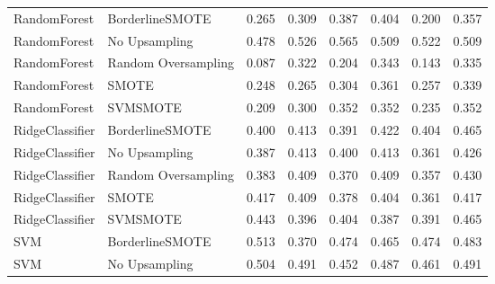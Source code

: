 \begin{tabular}{llllllll}
                RandomForest &     BorderlineSMOTE & 0.265 &                     0.309 &                 0.387 &                  0.404 &                                   0.200 &    0.357 \\
                RandomForest &       No Upsampling & 0.478 &                     0.526 &                 0.565 &                  0.509 &                                   0.522 &    0.509 \\
                RandomForest & Random Oversampling & 0.087 &                     0.322 &                 0.204 &                  0.343 &                                   0.143 &    0.335 \\
                RandomForest &               SMOTE & 0.248 &                     0.265 &                 0.304 &                  0.361 &                                   0.257 &    0.339 \\
                RandomForest &            SVMSMOTE & 0.209 &                     0.300 &                 0.352 &                  0.352 &                                   0.235 &    0.352 \\
             RidgeClassifier &     BorderlineSMOTE & 0.400 &                     0.413 &                 0.391 &                  0.422 &                                   0.404 &    0.465 \\
             RidgeClassifier &       No Upsampling & 0.387 &                     0.413 &                 0.400 &                  0.413 &                                   0.361 &    0.426 \\
             RidgeClassifier & Random Oversampling & 0.383 &                     0.409 &                 0.370 &                  0.409 &                                   0.357 &    0.430 \\
             RidgeClassifier &               SMOTE & 0.417 &                     0.409 &                 0.378 &                  0.404 &                                   0.361 &    0.417 \\
             RidgeClassifier &            SVMSMOTE & 0.443 &                     0.396 &                 0.404 &                  0.387 &                                   0.391 &    0.465 \\
                         SVM &     BorderlineSMOTE & 0.513 &                     0.370 &                 0.474 &                  0.465 &                                   0.474 &    0.483 \\
                         SVM &       No Upsampling & 0.504 &                     0.491 &                 0.452 &                  0.487 &                                   0.461 &    0.491 \\

\end{tabular}

